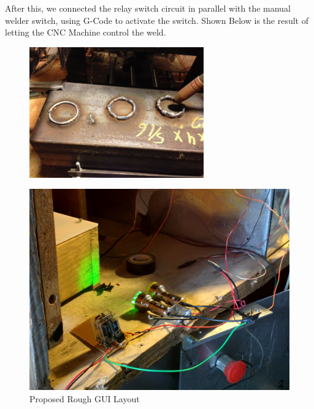\documentclass[12pt]{article}
\begin{document}
After this, we connected the relay switch circuit in parallel with the manual welder switch, using G-Code to activate the switch. Shown Below is the result of letting the CNC Machine control the weld.

\begin{figure}[h]
\centering
\includegraphics[width=0.67\textwidth]{pic3}
\end{figure}

\clearpage

\bigskip
\begin{figure}[h]
\centering
\includegraphics[width=1\textwidth]{IMG_20150410_163658}
\caption{Proposed Rough GUI Layout}
\end{figure}

\clearpage
\end{document}
